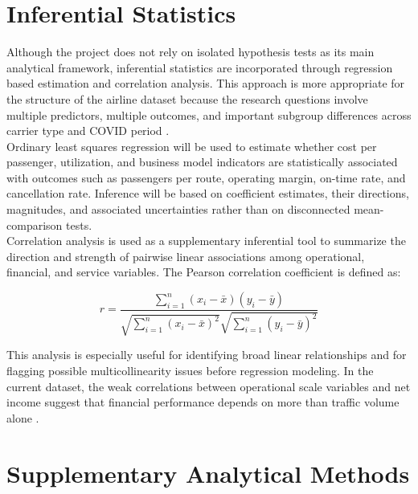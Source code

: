 \documentclass[11pt, letterpaper]{article}
\begin{document}
\section{Inferential Statistics}
Although the project does not rely on isolated hypothesis tests as its main analytical framework, inferential statistics are incorporated through regression based estimation and correlation analysis. This approach is more appropriate for the structure of the airline dataset because the research questions involve multiple predictors, multiple outcomes, and important subgroup differences across carrier type and COVID period \cite{li2025, nguyen2022}.\\
\indent Ordinary least squares regression will be used to estimate whether cost per passenger, utilization, and business model indicators are statistically associated with outcomes such as passengers per route, operating margin, on-time rate, and cancellation rate. Inference will be based on coefficient estimates, their directions, magnitudes, and associated uncertainties rather than on disconnected mean-comparison tests.\\
\indent Correlation analysis is used as a supplementary inferential tool to summarize the direction and strength of pairwise linear associations among operational, financial, and service variables. The Pearson correlation coefficient is defined as:

\begin{equation*}
r =
\frac{\sum_{i=1}^{n} (x_i - \bar{x})(y_i - \bar{y})}
{\sqrt{\sum_{i=1}^{n} (x_i - \bar{x})^2}
\sqrt{\sum_{i=1}^{n} (y_i - \bar{y})^2}}
\end{equation*}

This analysis is especially useful for identifying broad linear relationships and for flagging possible multicollinearity issues before regression modeling. In the current dataset, the weak correlations between operational scale variables and net income suggest that financial performance depends on more than traffic volume alone \cite{banker1993, zuidberg2014}.

\section{Supplementary Analytical Methods}
\end{document}

